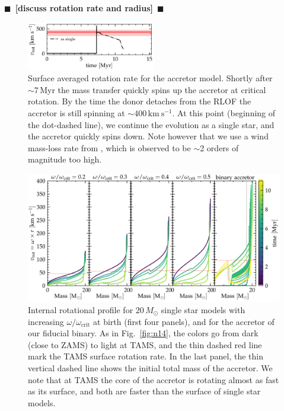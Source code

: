 \documentclass[twocolumn,twocolappendix,trackchanges]{aastex63}
\newcommand{\kms}{{\mathrm{km\ s^{-1}}}}
\DeclareRobustCommand{\Figref}[1]{Fig.~\ref{#1}}
\newcommand{\todo}[1]{{\large $\blacksquare$~\textbf{\color{red}[#1]}}~$\blacksquare$}
\begin{document}
\todo{discuss rotation rate and radius}

\begin{figure}[htbp]
  \includegraphics[width=0.5\textwidth]{zeta_rot}
  \caption{Surface averaged rotation rate for the accretor
    model. Shortly after $\sim$7\,Myr the mass transfer quickly spins
    up the accretor at critical rotation. By the time the donor
    detaches from the RLOF the accretor is still spinning at
    $\sim$$400\,\kms$. At this point (beginning of the dot-dashed line), we continue the evolution as a single star, and the accretor quickly spins down. Note however that we use a wind mass-loss rate from \cite{vink:01}, which is observed to be
    $\sim$2 orders of magnitude too high.}
  \label{fig:rot}
\end{figure}


\begin{figure}[htbp]
  \centering
  \includegraphics[width=\textwidth]{zeta_Rotational_struct}
  \caption{Internal rotational profile for $20\,M_\odot$ single star models with
    increasing $\omega/\omega_\mathrm{crit}$ at birth (first four
    panels), and for the accretor of our fiducial binary. As in \Figref{fig:n14}, the colors go from dark (close to ZAMS) to light at TAMS, and the thin dashed red line mark the TAMS surface rotation rate. In the last panel, the thin vertical dashed line shows the initial total mass of the accretor. We note that at TAMS the core of the accretor is rotating almost as fast as its surface, and both are faster than the surface of single star models.}
\end{figure}
\end{document}
